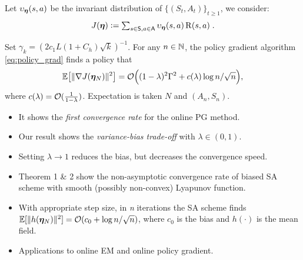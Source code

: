\documentclass[a0,landscape]{a0poster}
\begin{document}
\begin{multicols}{3}
\begin{tcolorbox}[colback=white!5!white,colframe=red!75!black,fonttitle=\sffamily\bfseries\large,title=Analysis of Policy Gradient Method (Application of Case 2)]
Let $\upsilon_{\bm{\eta}}(s,a)$ be the invariant distribution of $\{ (S_t,A_t) \}_{t \geq 1}$, we consider:
{\large\[ \textstyle
J( \prm ) \eqdef \sum_{s \in \Sset,a \in \Aset} \invarMDP_{\prm}(s,a) \Reward(s,a) \eqsp.\vspace{-.75cm}
\]}
\begin{coro} \vspace{-.5cm}
Set $\gamma_k = (2 c_1 L (1+C_h) \sqrt{k})^{-1}$. For any $n \in \mathbb{N}$,  the policy gradient algorithm \eqref{eq:policy_grad} finds a policy that
{\large\[
\mathbb{E} \big[ \| {\nabla} J( \bm{\eta}_N ) \|^2 \big] = {\cal O} \Big( (1-\lambda)^2 \Gamma^2 + c(\lambda) \log n / \sqrt{n} \Big),
\]}
where $c(\lambda) = {\cal O}( \frac{1}{1-\lambda})$. Expectation is taken \wrt $N$ and $(A_n,S_n)$. 
\end{coro}
\begin{itemize}
\item It shows the \emph{\color{red}first convergence rate} for the online PG method.
\item Our result shows the \emph{\color{red} variance-bias trade-off} with $\lambda \in (0,1)$. 
\item Setting $\lambda \rightarrow 1$ reduces the bias, but decreases the convergence speed.
\end{itemize}
\end{tcolorbox}

\begin{tcolorbox}[colback=white!5!white,colframe=blue!75!black,fonttitle=\sffamily\bfseries\large,title=Conclusion]
\begin{itemize}
\item {\color{blue} Theorem 1 \& 2} show the non-asymptotic convergence rate of biased SA scheme with smooth (possibly non-convex) Lyapunov function. 
\item With appropriate step size, in \emph{n} iterations the SA scheme finds 
$\mathbb{E}[ \| h( \bm{\eta}_N ) \|^2 ] = {\cal O}( c_0 + \log n / \sqrt{n} )$, where $c_0$ is the bias and $h(\cdot)$ is the mean field.
\item Applications to online EM and online policy gradient.
\end{itemize}
\end{tcolorbox}
\vspace{-1.3cm}
\small



\end{multicols}
\end{document}
